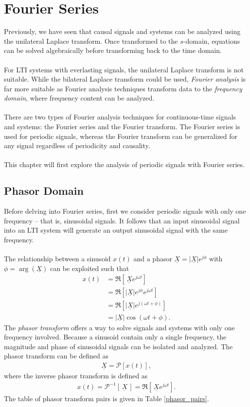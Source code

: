 \documentclass{report}
\begin{document}
\setcounter{chapter}{4}
\chapter{Fourier Series}
Previously, we have seen that causal signals and systems can be analyzed using the unilateral Laplace transform. Once transformed to the $s$-domain, 
equations can be solved algebraically before transforming back to the time domain.
\\ \\
For LTI systems with everlasting signals, the unilateral Laplace transform is not suitable. While the bilateral Laplace transform could be used, \emph{Fourier analysis} is far more 
suitable as Fourier analysis techniques transform data to the \emph{frequency domain}, where frequency content can be analyzed. 
\\ \\
There are two types of Fourier analysis techniques for continuous-time signals and systems: the Fourier series and the Fourier transform. The Fourier series is used for periodic signals, 
whereas the Fourier transform can be generalized for any signal regardless of periodicity and causality.
\\ \\
This chapter will first explore the analysis of periodic signals with Fourier series. 

\section{Phasor Domain}
Before delving into Fourier series, first we consider periodic signals with only one frequency -- that is, sinusoidal signals. It follows that an input sinusoidal signal into an LTI system will generate 
an output sinusoidal signal with the same frequency.
\\ \\
The relationship between a sinusoid $x(t)$ and a phasor $\underline{X}=|\underline{X}|e^{j\phi}$ with $\phi=\arg(\underline{X})$ can be exploited such that 
\begin{align}
    x(t) &= \Re[\,\underline{X}e^{j\omega t}] \\ 
    &= \Re[|\underline{X}|e^{j\phi}e^{j\omega t}] \nonumber \\
    &= \Re[|\underline{X}|e^{j(\omega t+\phi)}] \nonumber \\
    &= |\underline{X}|\cos(\omega t+\phi).
\end{align}
The \emph{phasor transform} offers a way to solve signals and systems with only one frequency involved. Because a sinusoid contain only a single frequency, the magnitude and phase of sinusoidal signals can be isolated and analyzed. 
The phasor transform can be defined as 
\begin{align}
    \underline{X} = \mathcal{P}[x(t)],
\end{align}
where the inverse phasor transform is defined as 
\begin{align}
    x(t) = \mathcal{P}^{-1}[\,\underline{X}\,] = \Re[\,\underline{X}e^{j\omega t}].
\end{align}
The table of phasor transform pairs is given in Table \ref{phasor_pairs}.
\end{document}
